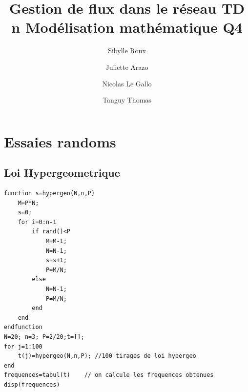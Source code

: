 \documentclass{article}
\begin{document}
\title{Gestion de flux dans le réseau
	\smallbreak
	TD n
	\smallbreak
	Modélisation mathématique
	\smallbreak
	Q4}
\author{Sibylle Roux \and Juliette Arazo \and Nicolas Le Gallo \and Tanguy Thomas}

\maketitle

\newpage

\tableofcontents

\newpage

\section{Essaies randoms}

\subsection{Loi Hypergeometrique}
\begin{verbatim}
function s=hypergeo(N,n,P)
    M=P*N;
    s=0;
    for i=0:n-1
        if rand()<P
            M=M-1;
            N=N-1;
            s=s+1;
            P=M/N;
        else
            N=N-1;
            P=M/N;
        end         
    end
endfunction
N=20; n=3; P=2/20;t=[];
for j=1:100
    t(j)=hypergeo(N,n,P); //100 tirages de loi hypergeo
end
frequences=tabul(t)    // on calcule les frequences obtenues
disp(frequences)
\end{verbatim}
\end{document}
